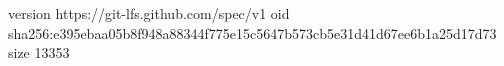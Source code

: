 version https://git-lfs.github.com/spec/v1
oid sha256:e395ebaa05b8f948a88344f775e15c5647b573cb5e31d41d67ee6b1a25d17d73
size 13353
